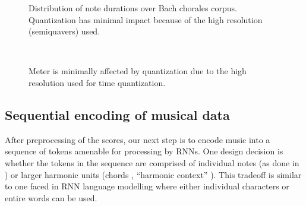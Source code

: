 \begin{figure}[tb]
    \centering
    \begin{subfigure}[t]{0.48\textwidth}
        \centering
        
    \end{subfigure}
    \begin{subfigure}[t]{0.48\textwidth}
        \centering
        
    \end{subfigure}
    \caption{Distribution of note durations over Bach chorales corpus. Quantization has minimal impact
    because of the high resolution (semiquavers) used.}
    \label{fig:note-lengths-time-quantization}
\end{figure}

\begin{figure}[tb]
    \centering
    \begin{subfigure}[t]{0.48\textwidth}
        \centering
        
    \end{subfigure}
    ~
    \begin{subfigure}[t]{0.48\textwidth}
        \centering
        
    \end{subfigure}
    \caption{Meter is minimally affected by quantization due to the high resolution used for
    time quantization.}
    \label{fig:meter-time-quantization}
\end{figure}

\subsection{Sequential encoding of musical data}
\label{sec:sequential-encoding}

After preprocessing of the scores, our next step is to encode music into a
sequence of tokens amenable for processing by RNNs. One design decision is
whether the tokens in the sequence are comprised of individual notes (as done
in \citep{mozer1994neural,franklin2004recurrent,sturm2016music}) or larger
harmonic units (\eg chords \citep{Eck2002,Boulanger-Lewandowski2012},
``harmonic context'' \citep{Allan2005}). This tradeoff is similar to one faced
in RNN language modelling where either individual characters or entire words
can be used.


